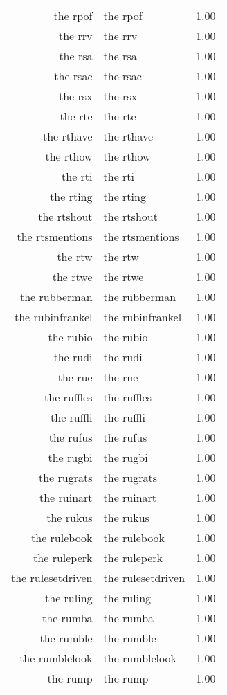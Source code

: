 \begin{table}[ht]
\begin{tabular}{rlr}
  the rpof & the rpof & 1.00 \\ 
  the rrv & the rrv & 1.00 \\ 
  the rsa & the rsa & 1.00 \\ 
  the rsac & the rsac & 1.00 \\ 
  the rsx & the rsx & 1.00 \\ 
  the rte & the rte & 1.00 \\ 
  the rthave & the rthave & 1.00 \\ 
  the rthow & the rthow & 1.00 \\ 
  the rti & the rti & 1.00 \\ 
  the rting & the rting & 1.00 \\ 
  the rtshout & the rtshout & 1.00 \\ 
  the rtsmentions & the rtsmentions & 1.00 \\ 
  the rtw & the rtw & 1.00 \\ 
  the rtwe & the rtwe & 1.00 \\ 
  the rubberman & the rubberman & 1.00 \\ 
  the rubinfrankel & the rubinfrankel & 1.00 \\ 
  the rubio & the rubio & 1.00 \\ 
  the rudi & the rudi & 1.00 \\ 
  the rue & the rue & 1.00 \\ 
  the ruffles & the ruffles & 1.00 \\ 
  the ruffli & the ruffli & 1.00 \\ 
  the rufus & the rufus & 1.00 \\ 
  the rugbi & the rugbi & 1.00 \\ 
  the rugrats & the rugrats & 1.00 \\ 
  the ruinart & the ruinart & 1.00 \\ 
  the rukus & the rukus & 1.00 \\ 
  the rulebook & the rulebook & 1.00 \\ 
  the ruleperk & the ruleperk & 1.00 \\ 
  the rulesetdriven & the rulesetdriven & 1.00 \\ 
  the ruling & the ruling & 1.00 \\ 
  the rumba & the rumba & 1.00 \\ 
  the rumble & the rumble & 1.00 \\ 
  the rumblelook & the rumblelook & 1.00 \\ 
  the rump & the rump & 1.00 \\ 

\end{tabular}
\end{table}
